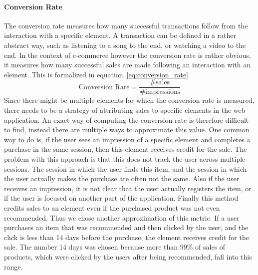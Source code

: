 \paragraph{Conversion Rate}\label{sec:conversion_rate}
The conversion rate measures how many successful transactions follow from the interaction with a specific element.
A transaction can be defined in a rather abstract way, such as listening to a song to the end, or watching a video to the end.
In the context of e-commerce however the conversion rate is rather obvious, it measures how many successful sales are made following an interaction with an element.
This is formalized in equation~\ref{eq:conversion_rate}
\begin{equation}\label{eq:conversion_rate}
    \text{Conversion Rate} = \frac{\#\text{sales}}{\#\text{impressions}}
\end{equation}
Since there might be multiple elements for which the conversion rate is measured, there needs to be a strategy of attributing sales to specific elements in the web application.
An exact way of computing the conversion rate is therefore difficult to find, instead there are multiple ways to approximate this value.
One common way to do is, if the user sees an impression of a specific element and completes a purchase in the same session, then this element receives credit for the sale.
The problem with this approach is that this does not track the user across multiple sessions.
The session in which the user finds this item, and the session in which the user actually makes the purchase are often not the same.
Also if the user receives an impression, it is not clear that the user actually registers the item, or if the user is focused on another part of the application.
Finally this method credits sales to an element even if the purchased product was not even recommended.
Thus we chose another approximation of this metric.
If a user purchases an item that was recommended and then clicked by the user, and the click is less than 14 days before the purchase, the element receives credit for the sale.
The number 14 days was chosen because more than 99\% of sales of products, which were clicked by the users after being recommended, fall into this range.